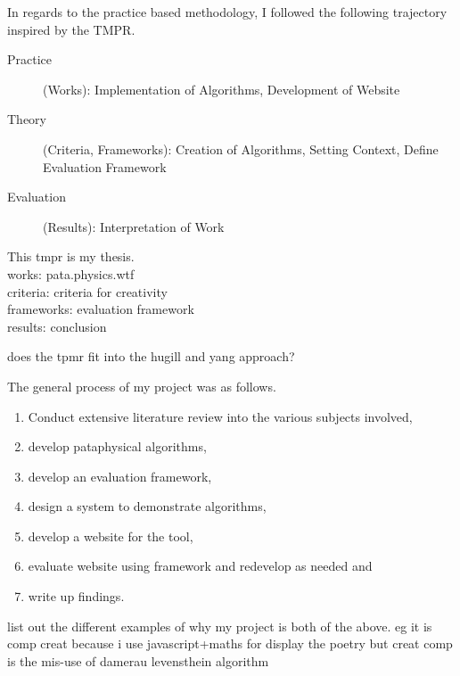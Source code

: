 \documentclass[11pt]{thesis} %
\begin{document}
In regards to the practice based methodology, I followed the following trajectory inspired by the \ac{TMPR}.


\begin{description}
  \item [Practice] (Works): Implementation of Algorithms, Development of Website
  \item [Theory] (Criteria, Frameworks): Creation of Algorithms, Setting Context, Define Evaluation Framework
  \item [Evaluation] (Results): Interpretation of Work
\end{description}

\begin{draft}
  This tmpr is my thesis.\\
  works: pata.physics.wtf\\
  criteria: criteria for creativity\\
  frameworks: evaluation framework\\
  results: conclusion
\end{draft}

\begin{draft}
  does the tpmr fit into the hugill and yang approach?
\end{draft}



The general process of my project was as follows.

\begin{enumerate}
  \item Conduct extensive literature review into the various subjects involved,
  \item develop pataphysical algorithms,
  \item develop an evaluation framework,
  \item design a system to demonstrate algorithms,
  \item develop a website for the tool,
  \item evaluate website using framework and redevelop as needed and
  \item write up findings.
\end{enumerate}


\begin{draft}
  list out the different examples of why my project is both of the above. 
  eg it is comp creat because i use javascript+maths for display the poetry
  but creat comp is the mis-use of damerau levensthein algorithm
\end{draft}
\end{document}
